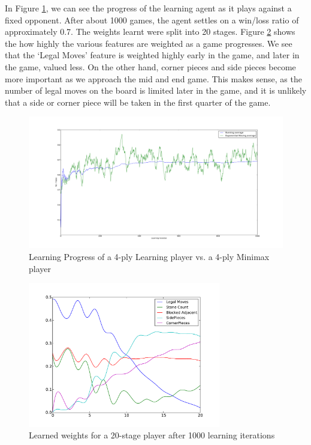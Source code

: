 \documentclass[11pt]{article}
\begin{document}
In Figure \ref{LearningProgress}, we can see the progress of the learning
agent as it plays against a fixed opponent. After about 1000 games, the agent
settles on a win/loss ratio of approximately 0.7.  The weights learnt were
split into 20 stages. Figure \ref{WeightsOverTime} shows the how highly the
various features are weighted as a game progresses. We see that the `Legal
Moves' feature is weighted highly early in the game, and later in the game,
valued less. On the other hand, corner pieces and side pieces become more
important as we approach the mid and end game. This makes sense, as the number
of legal moves on the board is limited later in the game, and it is unlikely
that a side or corner piece will be taken in the first quarter of the game.

\begin{figure}[htbp]
  \includegraphics[width=1\textwidth]{../Graphs/Learning_2ply_First1000.pdf}
  \caption{Learning Progress of a 4-ply Learning player vs. a 4-ply Minimax
    player}
  \label{LearningProgress}
\end{figure}

\begin{figure}[htbp]
  \centering
  \includegraphics[width=0.75\textwidth]{../Graphs/WeightsOverTime.pdf}
  \caption{Learned weights for a 20-stage player after 1000 learning
    iterations}
  \label{WeightsOverTime}
\end{figure}
\end{document}
